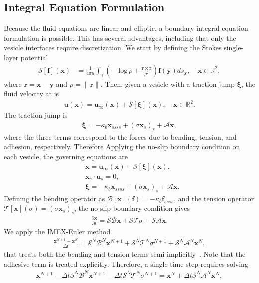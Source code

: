 \documentclass[prf,superscriptaddress,showpacs]{revtex4-1}
\renewcommand{\AA}{\mathcal{A}}
\newcommand{\BB}{\mathcal{B}}
\newcommand{\ff}{\mathbf{f}}
\newcommand{\pderiv}[2]{\frac{\partial #1}{\partial #2}}
\newcommand{\rr}{\mathbf{r}}
\newcommand{\RR}{\mathbb{R}}
\renewcommand{\SS}{\mathcal{S}}
\newcommand{\TT}{\mathcal{T}}
\newcommand{\uu}{\mathbf{u}}
\newcommand{\xx}{\mathbf{x}}
\newcommand{\xxi}{\boldsymbol{\xi}}
\newcommand{\yy}{\mathbf{y}}
\begin{document}
\subsection{Integral Equation Formulation}
Because the fluid equations are linear and elliptic, a boundary integral
equation formulation is possible.  This has several advantages,
including that only the vesicle interfaces require discretization.  We
start by defining the Stokes single-layer potential
\begin{align}
  \SS[\ff](\xx) &= \frac{1}{4\pi\mu} \int_\gamma \left(
    -\log \rho + \frac{\rr \otimes \rr}{\rho^2} \right) 
    \ff(\yy) ds_\yy, \quad \xx \in \RR^2,
  \label{eqn:SLP}
\end{align}
where $\rr = \xx - \yy$ and $\rho = \|\rr\|$.  Then, given a vesicle
with a traction jump $\xxi$, the fluid velocity at is~\cite{poz1992}
\begin{align*}
  \uu(\xx) = \uu_{\infty}(\xx) + \SS[\xxi](\xx), \quad \xx \in \RR^2.
\end{align*}
The traction jump is
\begin{align*}
  \xxi = -\kappa_b \xx_{ssss} + (\sigma \xx_s)_s + \AA \xx,
\end{align*}
where the three terms correspond to the forces due to bending, tension,
and adhesion, respectively.  Therefore Applying the no-slip boundary
condition on each vesicle, the governing equations are
\begin{align*}
  &\dot{\xx} = \uu_{\infty}(\xx) + \SS[\xxi](\xx), \\
  &\xx_s \cdot \uu_s = 0, \\
  &\xxi = -\kappa_b \xx_{ssss} + (\sigma \xx_s)_s + \AA\xx.
\end{align*}
Defining the bending operator as $\BB[\xx](\ff) = -\kappa_b \ff_{ssss}$,
and the tension operator $\TT[\xx](\sigma) = (\sigma \xx_s)_s$, the
no-slip boundary condition gives
\begin{align*}
  \pderiv{\xx}{t} = \SS \BB \xx + \SS \TT \sigma + \SS \AA \xx.
\end{align*}
We apply the IMEX-Euler method 
\begin{align*}
  \frac{\xx^{N+1} - \xx^N}{\Delta t} = \SS^N \BB^N \xx^{N+1} + 
  \SS^N \TT^N \sigma^{N+1} + \SS^N \AA^N \xx^N,
\end{align*}
that treats both the bending and tension terms
semi-implicitly~\cite{qua-bir2014}. Note that the adhesive term is
treated explicitly.  Therefore, a single time step requires solving
\begin{align*}
  \xx^{N+1} - \Delta t \SS^N \BB^N \xx^{N+1} - 
    \Delta t \SS^N \TT^N \sigma^{N+1} = \xx^N + 
    \Delta t \SS^N \AA^N \xx^N,
\end{align*}
\end{document}
